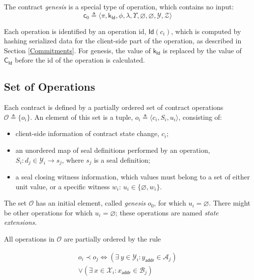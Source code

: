 \documentclass[9pt,oneside]{amsart}
\begin{document}
\begin{multicols}{2}

The contract \emph{genesis} is a special type of operation, which contains no input:
\noindent
\begin{equation}
\mathsf{c}_0 \triangleq \langle \pi, \mathsf{k_{Id}}, \phi, \lambda, \Upsilon, \varnothing, \varnothing, \mathcal{Y}, \mathcal{Z} \rangle
\end{equation}

Each operation is identified by an operation id, $\mathsf{Id}(c_i)$, which is computed by
hashing serialized data for the client-side part of the operation,
as described in Section \ref{Commitments}. For genesis, the value of $\mathsf{k_{Id}}$
is replaced by the value of $\mathsf{C_{Id}}$ before the id of the operation is calculated.

\subsection{Set of Operations}

Each contract is defined by a partially ordered set of contract operations
$\mathcal{O} \triangleq \{ o_i \}$.
An element of this set is a tuple, $o_i \triangleq \langle c_i, S_i, u_i \rangle$, consisting of:
\begin{itemize}
\item client-side information of contract state change, $c_i$;
\item an unordered map of seal definitions performed by an operation, 
  $S_i: d_j \in \mathcal{Y}_i \rightarrow s_j$, where $s_j$ is a seal definition;
\item a seal closing witness information, 
  which values must belong to a set of either unit value, or a specific witness $w_i$: 
  $u_i \in \{ \varnothing, w_i \}$.
\end{itemize}

The set $\mathcal{O}$ has an initial element, called \emph{genesis} $o_0$, for which $u_i = \varnothing$.
There might be other operations for which $u_i = \varnothing$;
these operations are named \emph{state extensions}.

All operations in $\mathcal{O}$ are partially ordered by the rule

\begin{equation}
\begin{split}
o_i \prec o_j \Longleftrightarrow (\exists \ y \in \mathcal{Y}_i: y_\mathsf{addr} \in \mathcal{A}_j) \\
\vee (\exists \ x \in \mathcal{X}_i: x_\mathsf{addr} \in \mathcal{B}_j)
\end{split}
\end{equation}


\end{multicols}
\end{document}
